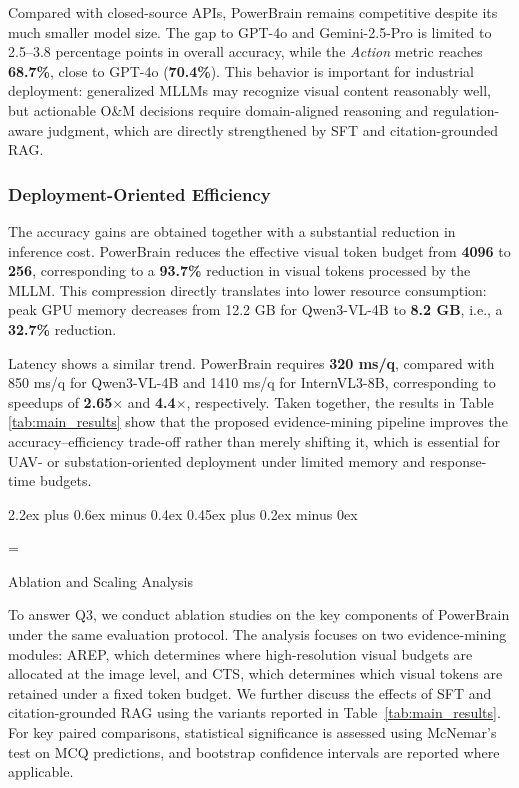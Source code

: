 \documentclass[journal,twoside,web]{ieeecolor}
\makeatletter
\renewcommand{\subsection}{\@startsection{subsection}{2}{\z@}%
  {2.2ex plus 0.6ex minus 0.4ex}%
  {0.45ex plus 0.2ex minus 0ex}%
  {\color{myorange}\normalsize\normalfont\everymath={\sf}\sf\itshape\raggedright}}
\makeatother
\begin{document}
Compared with closed-source APIs, PowerBrain remains competitive despite its much smaller model size. The gap to GPT-4o and Gemini-2.5-Pro is limited to 2.5--3.8 percentage points in overall accuracy, while the \textit{Action} metric reaches \textbf{68.7\%}, close to GPT-4o (\textbf{70.4\%}). This behavior is important for industrial deployment: generalized MLLMs may recognize visual content reasonably well, but actionable O\&M decisions require domain-aligned reasoning and regulation-aware judgment, which are directly strengthened by SFT and citation-grounded RAG.

\subsubsection{Deployment-Oriented Efficiency}
The accuracy gains are obtained together with a substantial reduction in inference cost. PowerBrain reduces the effective visual token budget from \textbf{4096} to \textbf{256}, corresponding to a \textbf{93.7\%} reduction in visual tokens processed by the MLLM. This compression directly translates into lower resource consumption: peak GPU memory decreases from 12.2 GB for Qwen3-VL-4B to \textbf{8.2 GB}, i.e., a \textbf{32.7\%} reduction.

Latency shows a similar trend. PowerBrain requires \textbf{320 ms/q}, compared with 850 ms/q for Qwen3-VL-4B and 1410 ms/q for InternVL3-8B, corresponding to speedups of \textbf{2.65$\times$} and \textbf{4.4$\times$}, respectively. Taken together, the results in Table \ref{tab:main_results} show that the proposed evidence-mining pipeline improves the accuracy--efficiency trade-off rather than merely shifting it, which is essential for UAV- or substation-oriented deployment under limited memory and response-time budgets.

\subsection{Ablation and Scaling Analysis}
\label{sec:ablation_scaling}

To answer Q3, we conduct ablation studies on the key components of PowerBrain under the same evaluation protocol.
The analysis focuses on two evidence-mining modules: AREP, which determines where high-resolution visual budgets are allocated at the image level, and CTS, which determines which visual tokens are retained under a fixed token budget.
We further discuss the effects of SFT and citation-grounded RAG using the variants reported in Table~\ref{tab:main_results}.
For key paired comparisons, statistical significance is assessed using McNemar's test on MCQ predictions, and bootstrap confidence intervals are reported where applicable.
\end{document}
